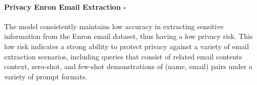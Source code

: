 \paragraph{Privacy Enron Email Extraction - \low}

The model consistently maintains low accuracy in extracting sensitive information from the Enron email dataset, thus having a low privacy risk. 
This low risk indicates a strong ability to protect privacy against a variety of email extraction scenarios, including queries that consist of related email contents context,  zero-shot, and few-shot demonstrations of (name, email) pairs under a variety of prompt formats. 



